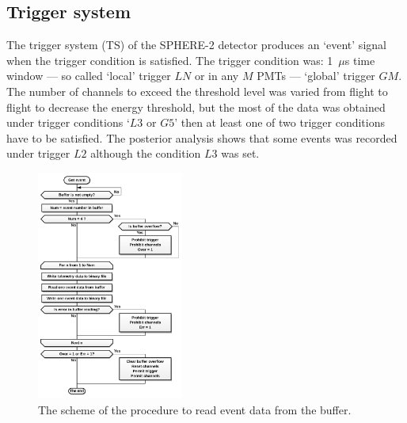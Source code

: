 \documentclass[final,5p,times,twocolumn]{elsarticle}
\begin{document}
\subsection{Trigger system}
The trigger system (TS) of the SPHERE-2 detector produces an `event' signal when the trigger condition is satisfied. The trigger condition was: 1~${\mu}$s time window --- so called `local' trigger $LN$ or in any $M$ PMTs --- `global' trigger $GM$. The number of channels to exceed the threshold level was varied from flight to flight to decrease the energy threshold, but the most of the data was obtained under trigger conditions `$L3$ or $G5$' then at least one of two trigger conditions have to be satisfied. The posterior analysis shows that some events was recorded under trigger $L2$ although the condition $L3$ was set.


\begin{figure}[t]
\centering
\includegraphics[width=0.43\textwidth]{figs/get_event_algorithm.pdf}\hspace{2pc}%
\caption{The scheme of the procedure to read event data from the buffer.}
\label{fig:get_event_algorithm}
\end{figure}
\end{document}
